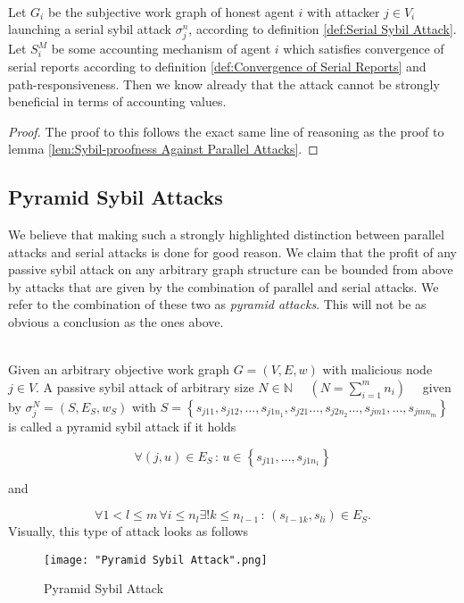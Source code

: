 \begin{lemma}[]\ \\
\label{lem:Sybil-proofness Against Serial Attacks}
\noindent{}Let $G_i$ be the subjective work graph of honest agent $i$ with attacker $j\in{}V_i$ launching a serial sybil attack $\sigma_j^n$, according to definition \ref{def:Serial Sybil Attack}. Let $S_i^M$ be some accounting mechanism of agent $i$ which satisfies convergence of serial reports according to definition \ref{def:Convergence of Serial Reports} and path-responsiveness. Then we know already that the attack cannot be strongly beneficial in terms of accounting values.
\end{lemma}
\begin{proof}
\noindent{}The proof to this follows the exact same line of reasoning as the proof to lemma \ref{lem:Sybil-proofness Against Parallel Attacks}.
\end{proof}

\subsection{Pyramid Sybil Attacks}
\label{subsec:Pyramid Sybil Attacks}
\noindent{}We believe that making such a strongly highlighted distinction between parallel attacks and serial attacks is done for good reason. We claim that the profit of any passive sybil attack on any arbitrary graph structure can be bounded from above by attacks that are given by the combination of parallel and serial attacks. We refer to the combination of these two as {\it pyramid attacks}. This will not be as obvious a conclusion as the ones above.\vspace{1em}\\

\begin{definition}\ \\
\label{def:Pyramid Sybil Attack}
Given an arbitrary objective work graph $G=(V,E,w)$ with malicious node $j\in{}V$. A passive sybil attack of arbitrary size $N\in\mathbb{N}\quad{}$ $\left(N=\sum\limits_{i=1}^{m}n_i\right)\quad$ given by $\sigma^N_j=(S,E_S,w_S)$ with $S=\left\lbrace{}s_{j11},s_{j12},\ldots,s_{j1n_1},s_{j21}\ldots,s_{j2n_2}\ldots,s_{jm1},\ldots,s_{jmn_m}\right\rbrace$ is called a pyramid sybil attack if it holds 


\[
\forall{}(j,u)\in{}E_S\,:\,u\in\left\lbrace{}s_{j11},\ldots,s_{j1n_1}\right\rbrace
\]

\noindent{}and

\[
\forall{}1<l\leq{}m\,\forall{}i\leq{}n_l\exists{}!k\leq{}n_{l-1}\,:\,(s_{l-1k},s_{li})\in{}E_S.
\]
\noindent{}Visually, this type of attack looks as follows\vspace{1em}\\

\begin{figure}[H]
\begin{center}
\texttt{[image: "Pyramid Sybil Attack".png]}
\caption{Pyramid Sybil Attack}
\label{fig:Pyramid Sybil Attack}
\end{center}
\end{figure}
\end{definition}


